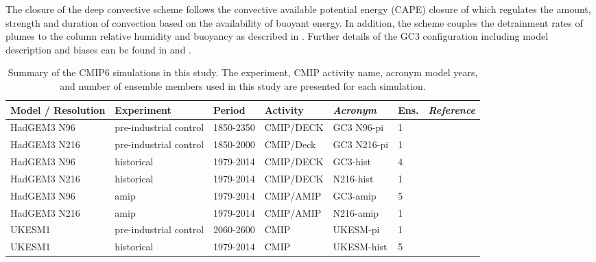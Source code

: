 The closure of the deep convective scheme follows the convective available potential energy (CAPE) closure of \cite{fritsch} which regulates the amount, strength and duration of convection based on the availability of buoyant energy. In addition, the scheme couples the detrainment rates of plumes to the column relative humidity and buoyancy as described in \cite{derbyshire2011}.
Further details of the GC3 configuration including model description and biases can be found in \cite{williams2018} and \cite{kuhlbrodt2018}.


\begin{table}
\small
\caption{Summary of the CMIP6 simulations in this study. The experiment, CMIP activity name, acronym model years, and number of ensemble members used in this study are presented for each simulation.}
\begin{tabular}{p{}|p{2.3cm}p{1.7cm}p{}p{}p{0.9cm}p{}} \label{tab:Sexps} \small
 Model / Resolution & Experiment & Period & Activity & \textit{Acronym}  & Ens. & \textit{Reference}                 \\ \hline \hline

HadGEM3 N96    &  pre-industrial control  & 1850-2350 & CMIP/DECK & GC3 N96-pi      & 1 &   \citep{gc3pi}                          \\
HadGEM3 N216  &  pre-industrial control & 1850-2000        & CMIP/Deck & GC3 N216-pi   & 1 & \citep{n216pi}      \\
HadGEM3 N96    &  historical & 1979-2014       & CMIP/DECK & GC3-hist     &  4 & \citep{gc3hist}                          \\
HadGEM3 N216   &  historical & 1979-2014        & CMIP/DECK & N216-hist   & 1 & \citep{n216pi}      \\
HadGEM3 N96   & amip  & 1979-2014 & CMIP/AMIP  & GC3-amip   & 5  &   \citep{gc3amip}                          \\
HadGEM3 N216   & amip  & 1979-2014 & CMIP/AMIP  & N216-amip   & 1  &   \citep{gc3amip}                          \\
UKESM1   &  pre-industrial control  & 2060-2600       & CMIP & UKESM-pi      & 1 & \citep{ukesmpi}            \\
UKESM1   &  historical  & 1979-2014       & CMIP & UKESM-hist & 5     &  \citep{ukesmhist}            \\
\end{tabular}
\end{table}

